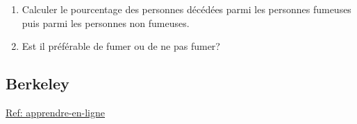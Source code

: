 \documentclass[10pt,dvipsnames, dvips, svgnames]{article}
\begin{document}




\begin{enumerate}
	\item Calculer le pourcentage des personnes décédées parmi les personnes  fumeuses puis parmi les personnes non fumeuses.
	\item Est il préférable de fumer ou de ne pas fumer?



\end{enumerate}




\subsection{Berkeley}

\href{https://www.apprendre-en-ligne.net/MADIMU2/STATI/STATI1.PDF}{Ref: apprendre-en-ligne}
\end{document}
